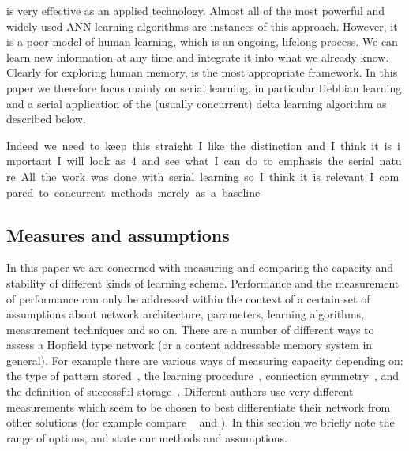  is very effective as an applied technology.  Almost all of the most powerful and widely used ANN learning algorithms are instances of this approach.  However, it is a poor model of human learning, which is an ongoing, lifelong process.  We can learn new information at any time and integrate it into what we already know.  Clearly for exploring human memory,  is the most appropriate framework.  In this paper we therefore  focus mainly on serial learning, in particular Hebbian learning and a serial application of the (usually concurrent) delta learning algorithm as described below.

\si{Indeed we need to keep this straight.  I like the distinction and I think it is important.  I will look as 4 and see what I can do to emphasis the serial nature.  All the work was done with serial learning so I think it is relevant. I compared to concurrent methods merely as a baseline}

\subsection{Measures and assumptions}   %
\label{sec:measurements}

In this paper we are concerned with measuring and comparing the capacity and stability of different kinds of learning scheme.  Performance and the measurement of performance can only be addressed within the context of a certain set of assumptions about network architecture, parameters, learning algorithms, measurement techniques and so on.  There are a number of different ways to assess a Hopfield type network (or a content addressable memory system in general). For example there are various ways of measuring capacity depending on: the type of pattern stored~\citep{Amit1987b}, the learning procedure~\citep{Storkey1999}, connection symmetry~\citep{Chen2001}, and the definition of successful storage~\citep{Lowe2005}. Different authors use very different measurements which seem to be chosen to best differentiate their network from other solutions (for example compare ~\citet{Christos1996} and \citet{vanHemmen1997}).  In this section we briefly note the range of options, and state our methods and assumptions.

